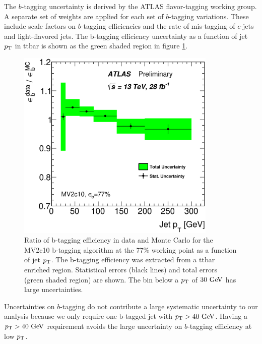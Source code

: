 \indent  The $b$-tagging uncertainty is derived by the ATLAS flavor-tagging working group.  A separate set of weights are applied for each set of $b$-tagging variations.  These include scale factors on $b$-tagging efficiencies and the rate of mis-tagging of $c$-jets and light-flavored jets. The b-tagging efficiency uncertainty as a function of jet $p_{\mathrm{T}}$ in ttbar is shown as the green shaded region in figure \ref{fig:sys:btag}. \\

\begin{figure}[!h]
\begin{center}
\includegraphics[width=0.85\textwidth]{figures/JetCalib/MV20c10_btaggingEff.eps}
\caption[Ratio of b-tagging efficiency in data and MC between data and MC.]{Ratio of b-tagging efficiency in data and Monte Carlo for the MV2c10 b-tagging algorithm at the 77\% working point as a function of jet $p_{\mathrm{T}}$. The b-tagging efficiency was extracted from a ttbar enriched region. Statistical errors (black lines) and total errors (green shaded region) are shown. The bin below a $p_{\mathrm{T}}$ of $30\gev$ has large uncertainties.}
\label{fig:sys:btag}
\end{center}
\end{figure}

\indent Uncertainties on $b$-tagging do not contribute a large systematic uncertainty to our analysis because we only require one b-tagged jet with $\pt > 40 \gev$.  Having a $\pt > 40 \gev$ requirement avoids the large uncertainty on $b$-tagging efficiency at low $p_{\mathrm{T}}$.  


